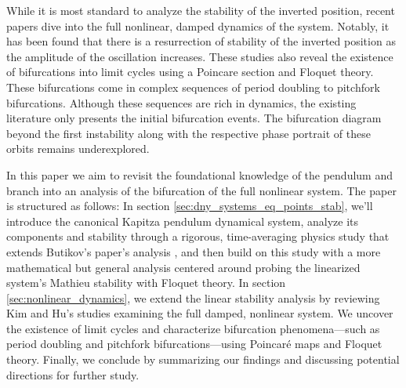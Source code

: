 \documentclass[12pt, letterpaper]{article}
\begin{document}
While it is most standard to analyze the stability of the inverted position, recent papers \cite{kim1998hu} dive into the full nonlinear, damped dynamics of the system. Notably, it has been found that there is a resurrection of stability of the inverted position as the amplitude of the oscillation increases. These studies also reveal the existence of bifurcations into limit cycles using a Poincare section and Floquet theory. These bifurcations come in complex sequences of period doubling to pitchfork bifurcations. Although these sequences are rich in dynamics, the existing literature only presents the initial bifurcation events. The bifurcation diagram beyond the first instability along with the respective phase portrait of these orbits remains underexplored. 

In this paper we aim to revisit the foundational knowledge of the pendulum and branch into an analysis of the bifurcation of the full nonlinear system. The paper is structured as follows: In section \ref{sec:dny_systems_eq_points_stab}, we'll introduce the canonical Kapitza pendulum dynamical system, analyze its components and stability through a rigorous, time-averaging physics study that extends Butikov's paper's analysis \cite{Butikov2017KapitzaS}, and then build on this study with a more mathematical but general analysis centered around probing the linearized system's Mathieu stability with Floquet theory. In section \ref{sec:nonlinear_dynamics}, we extend the linear stability analysis by reviewing Kim and Hu's studies examining the full damped, nonlinear system. We uncover the existence of limit cycles and characterize bifurcation phenomena—such as period doubling and pitchfork bifurcations—using Poincaré maps and Floquet theory. Finally, we conclude by summarizing our findings and discussing potential directions for further study.

\end{document}
